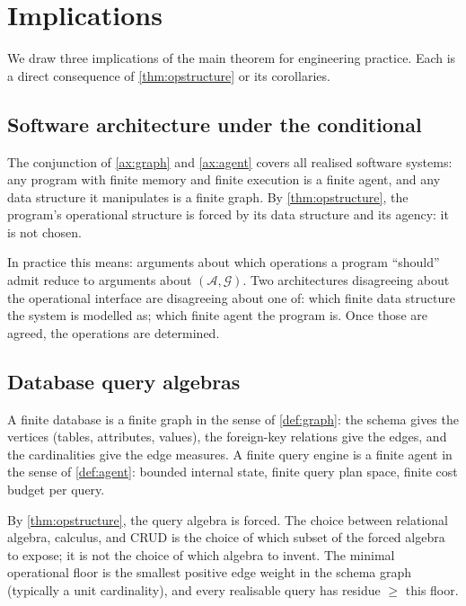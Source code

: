 \documentclass[11pt,a4paper]{article}
\theoremstyle{thmstyle}
\theoremstyle{definition}
\theoremstyle{remark}
\newcommand{\Graph}{\mathcal{G}}
\newcommand{\Agent}{\mathcal{A}}
\begin{document}
\section{Implications}
\label{sec:implications}

We draw three implications of the main theorem for engineering
practice. Each is a direct consequence of \cref{thm:opstructure} or
its corollaries.

\subsection{Software architecture under the conditional}

The conjunction of \cref{ax:graph} and \cref{ax:agent} covers all
realised software systems: any program with finite memory and
finite execution is a finite agent, and any data structure it
manipulates is a finite graph. By \cref{thm:opstructure}, the
program's operational structure is forced by its data structure and
its agency: it is not chosen.

In practice this means: arguments about which operations a program
``should'' admit reduce to arguments about $(\Agent, \Graph)$.
Two architectures disagreeing about the operational interface are
disagreeing about one of: which finite data structure the system is
modelled as; which finite agent the program is. Once those are
agreed, the operations are determined.

\subsection{Database query algebras}

A finite database is a finite graph in the sense of
\cref{def:graph}: the schema gives the vertices (tables, attributes,
values), the foreign-key relations give the edges, and the
cardinalities give the edge measures. A finite query engine is a
finite agent in the sense of \cref{def:agent}: bounded internal
state, finite query plan space, finite cost budget per query.

By \cref{thm:opstructure}, the query algebra is forced. The choice
between relational algebra, calculus, and CRUD is the choice of
which subset of the forced algebra to expose; it is not the choice
of which algebra to invent. The minimal operational floor is the
smallest positive edge weight in the schema graph (typically a unit
cardinality), and every realisable query has residue $\geq$ this
floor.
\end{document}
